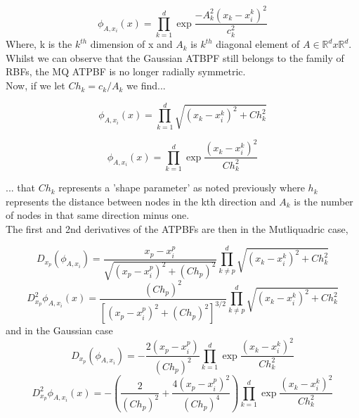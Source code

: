 \documentclass[a4paper]{amsart}
\begin{document}
\begin{equation}
\phi_{A,x_{i}}(x)= \prod^{d}_{k=1}\exp{\frac{-A^{2}_{k}(x_{k}-x^{k}_{i})^{2}}{ c^{2}_k}}
\end{equation}
Where, k is the $k^{th}$ dimension of x and $A_{k}$ is $k^{th}$ diagonal element of $A \in \mathbb{R}^{d} x \mathbb{R}^{d}$.\\

Whilst we can observe that the Gaussian ATBPF still belongs to the family of RBFs, the MQ ATPBF is no longer radially symmetric.\\

Now, if we let $Ch_{k} = c_{k} / A_{k}$ we find...

\begin{equation}
\phi_{A,x_{i}}(x)= \prod^{d}_{k=1}\sqrt{(x_{k}-x^{k}_{i})^{2}+Ch^{2}_k}
\end{equation}

\begin{equation}
\phi_{A,x_{i}}(x)= \prod^{d}_{k=1}\exp{\frac{(x_{k}-x^{k}_{i})^{2}}{ Ch^{2}_k}}
\end{equation}

... that $Ch_{k}$ represents a 'shape parameter' as noted previously where $h_{k}$ represents the distance between nodes in the kth direction and $A_{k}$ is the number of nodes in that same direction minus one.\\

The first and 2nd derivatives of the ATPBFs are then in the Mutliquadric case,

\begin{equation}
D_{x_{p}}(\phi_{A,x_{i}})=\frac{x_{p}-x^{p}_{i}}{\sqrt{(x_{p}-x^{p}_{i})^{2} + (Ch_{p})^2 }} \prod^{d}_{k\neq p}\sqrt{(x_{k}-x^{k}_{i})^{2}+Ch^{2}_k}
\end{equation}
\begin{equation}
D_{x_{p}}^{2}\phi_{A,x_{i}}(x)=\frac{(Ch_{p})^{2}}{[(x_{p}-x^{p}_{i})^{2} + (Ch_{p})^2 ]^{3/2}} \prod^{d}_{k\neq p}\sqrt{(x_{k}-x^{k}_{i})^{2}+Ch^{2}_k}
\end{equation}
and in the Gaussian case
\begin{equation}
D_{x_{p}}(\phi_{A,x_{i}})= -\frac{2(x_{p}-x^{p}_{i})}{(Ch_{p})^{2}} \prod^{d}_{k=1}\exp{\frac{(x_{k}-x^{k}_{i})^{2}}{ Ch^{2}_k}}
\end{equation}
\begin{equation}
D_{x_{p}}^{2}\phi_{A,x_{i}}(x)= -(\frac{2}{(Ch_{p})^{2}} + \frac{4(x_{p}-x^{p}_{i})^{2}}{(Ch_{p})^{4}}) \prod^{d}_{k=1}\exp{\frac{(x_{k}-x^{k}_{i})^{2}}{ Ch^{2}_k}}
\end{equation}
\end{document}
